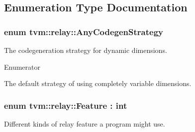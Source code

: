 \subsection{Enumeration Type Documentation}
\subsubsection[{\texorpdfstring{Any\+Codegen\+Strategy}{AnyCodegenStrategy}}]{\setlength{\rightskip}{0pt plus 5cm}enum {\bf tvm\+::relay\+::\+Any\+Codegen\+Strategy}}\hypertarget{namespacetvm_1_1relay_adab76fedc831b249d1c80d69c4a620a3}{}\label{namespacetvm_1_1relay_adab76fedc831b249d1c80d69c4a620a3}


The codegeneration strategy for dynamic dimensions. 

\begin{Desc}
\item[Enumerator]\par
\begin{description}
\item[{\em 
k\+Variable\+Dimensions\hypertarget{namespacetvm_1_1relay_adab76fedc831b249d1c80d69c4a620a3a1a3550732b0caf3981198af2c1373542}{}\label{namespacetvm_1_1relay_adab76fedc831b249d1c80d69c4a620a3a1a3550732b0caf3981198af2c1373542}
}]The default strategy of using completely variable dimensions. \end{description}
\end{Desc}
\subsubsection[{\texorpdfstring{Feature}{Feature}}]{\setlength{\rightskip}{0pt plus 5cm}enum {\bf tvm\+::relay\+::\+Feature} \+: int}\hypertarget{namespacetvm_1_1relay_a926750aeda977340aa82bceac863fc9e}{}\label{namespacetvm_1_1relay_a926750aeda977340aa82bceac863fc9e}


Different kinds of relay feature a program might use. 

